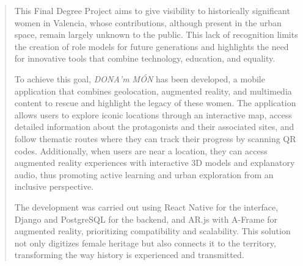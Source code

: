 \documentclass[twoside,spanish,a4paper,12pt]{tfg}
\begin{document}
\begin{abstract}
\setlength{\parskip}{8pt plus 2pt minus 1pt}
This Final Degree Project aims to give visibility to historically significant women in Valencia, whose contributions, although present in the urban space, remain largely unknown to the public. This lack of recognition limits the creation of role models for future generations and highlights the need for innovative tools that combine technology, education, and equality.

To achieve this goal, \textit{DONA'm MÓN} has been developed, a mobile application that combines geolocation, augmented reality, and multimedia content to rescue and highlight the legacy of these women. The application allows users to explore iconic locations through an interactive map, access detailed information about the protagonists and their associated sites, and follow thematic routes where they can track their progress by scanning QR codes. Additionally, when users are near a location, they can access augmented reality experiences with interactive 3D models and explanatory audio, thus promoting active learning and urban exploration from an inclusive perspective.

The development was carried out using React Native for the interface, Django and PostgreSQL for the backend, and AR.js with A-Frame for augmented reality, prioritizing compatibility and scalability. This solution not only digitizes female heritage but also connects it to the territory, transforming the way history is experienced and transmitted.

\end{abstract}
\cleardoublepage
\end{document}
